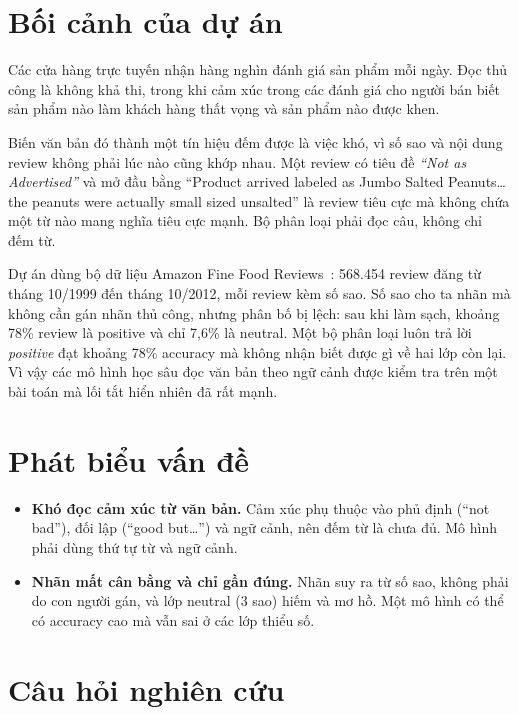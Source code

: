 \section{Bối cảnh của dự án}
\label{sec:1-1}

Các cửa hàng trực tuyến nhận hàng nghìn đánh giá sản phẩm mỗi ngày. Đọc thủ công là không khả thi, trong khi cảm xúc trong các đánh giá cho người bán biết sản phẩm nào làm khách hàng thất vọng và sản phẩm nào được khen.

Biến văn bản đó thành một tín hiệu đếm được là việc khó, vì số sao và nội dung review không phải lúc nào cũng khớp nhau. Một review có tiêu đề \emph{``Not as Advertised''} và mở đầu bằng ``Product arrived labeled as Jumbo Salted Peanuts\ldots the peanuts were actually small sized unsalted'' là review tiêu cực mà không chứa một từ nào mang nghĩa tiêu cực mạnh. Bộ phân loại phải đọc câu, không chỉ đếm từ.

Dự án dùng bộ dữ liệu Amazon Fine Food Reviews~\cite{mcauley2013,kaggle_fine_food}: 568.454 review đăng từ tháng 10/1999 đến tháng 10/2012, mỗi review kèm số sao. Số sao cho ta nhãn mà không cần gán nhãn thủ công, nhưng phân bố bị lệch: sau khi làm sạch, khoảng 78\% review là positive và chỉ 7,6\% là neutral. Một bộ phân loại luôn trả lời \emph{positive} đạt khoảng 78\% accuracy mà không nhận biết được gì về hai lớp còn lại. Vì vậy các mô hình học sâu đọc văn bản theo ngữ cảnh được kiểm tra trên một bài toán mà lối tắt hiển nhiên đã rất mạnh.

\section{Phát biểu vấn đề}
\label{sec:1-2}

\begin{itemize}
    \item \textbf{Khó đọc cảm xúc từ văn bản.} Cảm xúc phụ thuộc vào phủ định (``not bad''), đối lập (``good but\ldots'') và ngữ cảnh, nên đếm từ là chưa đủ. Mô hình phải dùng thứ tự từ và ngữ cảnh.
    \item \textbf{Nhãn mất cân bằng và chỉ gần đúng.} Nhãn suy ra từ số sao, không phải do con người gán, và lớp neutral (3 sao) hiếm và mơ hồ. Một mô hình có thể có accuracy cao mà vẫn sai ở các lớp thiểu số.
\end{itemize}

\section{Câu hỏi nghiên cứu}
\label{sec:1-3}

